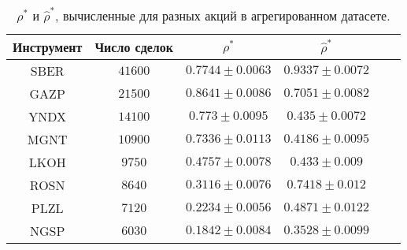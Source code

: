 \begin{table}[h!]
    \begin{center}
        \begin{tabular}{|c|c|c|c|c|c|}
            \hline
            Инструмент        & Число сделок & $\rho^*$ & $\hat \rho^*$ \\ \hline
            SBER & $41600 $ & $ 0.7744 \pm 0.0063 $ & $ 0.9337 \pm 0.0072 $ \\ \hline
            GAZP & $21500 $ & $ 0.8641 \pm 0.0086 $ & $ 0.7051 \pm 0.0082 $ \\ \hline
            YNDX & $14100 $ & $ 0.773  \pm 0.0095 $ & $ 0.435  \pm 0.0072 $ \\ \hline
            MGNT & $10900 $ & $ 0.7336 \pm 0.0113 $ & $ 0.4186 \pm 0.0095 $ \\ \hline
            LKOH & $9750  $ & $ 0.4757 \pm 0.0078 $ & $ 0.433  \pm 0.009  $\\ \hline
            ROSN & $8640  $ & $ 0.3116 \pm 0.0076 $ & $ 0.7418 \pm 0.012  $\\ \hline
            PLZL & $7120  $ & $ 0.2234 \pm 0.0056 $ & $ 0.4871 \pm 0.0122 $ \\ \hline
            NGSP & $6030  $ & $ 0.1842 \pm 0.0084 $ & $ 0.3528 \pm 0.0099 $ \\ \hline
        \end{tabular}
    \end{center}
    \caption{$\rho^*$ и $\hat \rho^*$, вычисленные для разных акций в агрегированном датасете.}
    \label{Aggreg1SE}
    \end{table} 